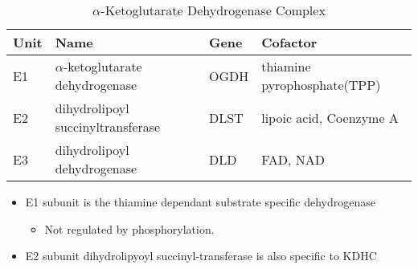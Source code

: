 \documentclass{scrartcl}
\begin{document}

\begin{table}[htbp]
\caption{\label{tab:orgc5e375c}
\(\alpha\)-Ketoglutarate Dehydrogenase Complex}
\centering
\begin{tabular}{llll}
Unit & Name & Gene & Cofactor\\
\hline
E1 & \(\alpha\)-ketoglutarate dehydrogenase & OGDH & thiamine pyrophosphate(TPP)\\
E2 & dihydrolipoyl succinyltransferase & DLST & lipoic acid, Coenzyme A\\
E3 & dihydrolipoyl dehydrogenase & DLD & FAD, NAD\\
\end{tabular}
\end{table}

\begin{itemize}
\item E1 subunit is the thiamine dependant substrate specific dehydrogenase
\begin{itemize}
\item Not regulated by phosphorylation.
\end{itemize}
\item E2 subunit dihydrolipyoyl succinyl-transferase is also specific to KDHC
\end{itemize}
\end{document}
